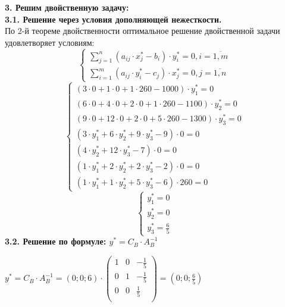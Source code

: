{\bf3. Решим двойственную задачу:}\\
{\bf3.1. Решение через условия дополняющей нежесткости.}\\
По 2-й теореме двойственности оптимальное решение двойственной задачи удовлетворяет условиям:
\begin{equation*}
    \begin{cases}
        \displaystyle\sum_{j=1}^{n} (a_{ij} \cdot x_{j}^{*} - b_{i}) \cdot y_{i}^{*} = 0, i = \overline{1, m}\\
        \displaystyle\sum_{i=1}^{m} (a_{ij} \cdot y_{i}^{*} - c_{j}) \cdot x_{j}^{*} = 0, j = \overline{1, n}
    \end{cases}
\end{equation*}
\begin{equation*}
    \begin{cases}
        (3 \cdot 0 + 1 \cdot 0 + 1 \cdot 260 - 1000) \cdot y_{1}^{*} = 0\\
        (6 \cdot 0 + 4 \cdot 0 + 2 \cdot 0 + 1 \cdot 260 - 1100) \cdot y_{2}^{*} = 0\\
        (9 \cdot 0 + 12 \cdot 0 + 2 \cdot 0 + 5 \cdot 260 - 1300) \cdot y_{3}^{*} = 0\\
        (3 \cdot y_{1}^{*} + 6 \cdot y_{2}^{*} + 9 \cdot y_{3}^{*} - 9) \cdot 0 = 0\\
        (4 \cdot y_{2}^{*} + 12 \cdot y_{3}^{*} - 7) \cdot 0 = 0\\
        (1 \cdot y_{1}^{*} + 2 \cdot y_{2}^{*} + 2 \cdot y_{3}^{*} - 2) \cdot 0 = 0\\
        (1 \cdot y_{1}^{*} + 1 \cdot y_{2}^{*} + 5 \cdot y_{3}^{*} - 6) \cdot 260 = 0
    \end{cases}
\end{equation*}
\begin{equation*}
    \begin{cases}
        y_{1}^{*} = 0\\
        y_{2}^{*} = 0\\
        y_{3}^{*} = \frac{6}{5}
    \end{cases}
\end{equation*}
{\bf3.2. Решение по формуле: $y^{*} = C_{B} \cdot A_{B}^{-1}$}
\begin{flushleft}
    $y^{*} = C_{B} \cdot A_{B}^{-1} = (0; 0; 6) \cdot \begin{pmatrix}
1 & 0 & -\frac{1}{5} \\
0 & 1 & -\frac{1}{5}\\
0 & 0 & \frac{1}{5}\\
\end{pmatrix} = (0; 0; \frac{6}{5})$
\end{flushleft}

